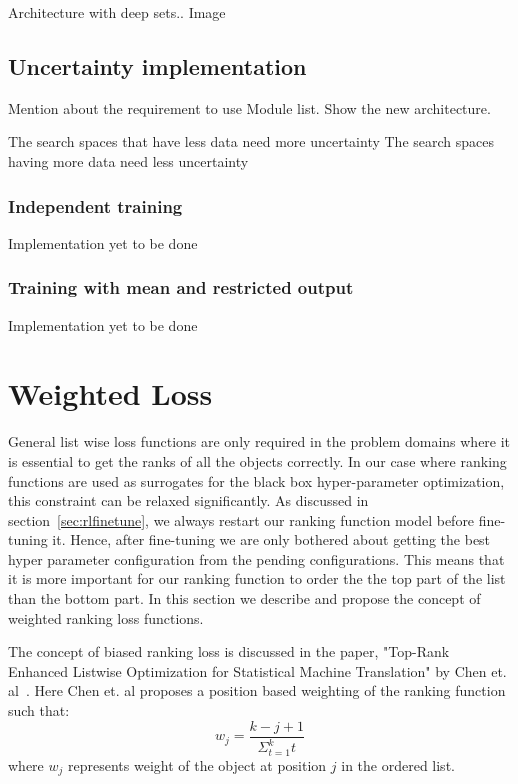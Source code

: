 \documentclass[11pt]{report}
\begin{document}
Architecture with deep sets.. Image

\subsection{Uncertainty implementation}
Mention about the requirement to use Module list.
Show the new architecture.

The search spaces that have less data need more uncertainty
The search spaces having more data need less uncertainty

\subsubsection{Independent training}
Implementation yet to be done

\subsubsection{Training with mean and restricted output}
Implementation yet to be done


\section{Weighted Loss}
General list wise loss functions are only required in the problem domains where it is essential to get the ranks of all the objects correctly.
In our case where ranking functions are used as surrogates for the black box hyper-parameter optimization,
this constraint can be relaxed significantly.
As discussed in section~\ref{sec:rlfinetune},  we always restart our ranking function model before
fine-tuning it.
Hence,  after fine-tuning we are only bothered about getting the best hyper parameter configuration from the pending configurations.
This means that it is more important for our ranking function to order the the top part of the list than the bottom part.
In this section we describe and propose the concept of weighted ranking loss functions.

The concept of biased ranking loss is discussed in the paper, "Top-Rank Enhanced Listwise Optimization for Statistical Machine Translation" by  Chen et. al~\cite{TRLWO}.
Here Chen et. al proposes a position based weighting of the ranking function such that:
\begin{equation}
w_j = \frac{k - j + 1}{\Sigma_{t=1}^k t}
\end{equation}
where $w_j$ represents weight of the object at position $j$ in the ordered list.
\end{document}
